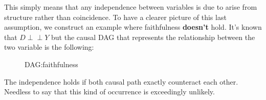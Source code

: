 \label{ass:Faith}
This simply means that any independence between variables is due to arise from structure rather than coincidence.
To have a clearer picture of this last assumption, we construct an example where faithfulness \textbf{doesn't} hold. It's known that $D \perp\!\!\!\perp Y$ but the causal DAG that represents the relationship between the two variable is the following:
\begin{figure}[H]
	\centering
\caption{DAG:faithfulness}
\label{DAG:faithfulness}
\end{figure}
The independence holds if both causal path exactly counteract each other. Needless to say that this kind of occurrence is exceedingly unlikely.

